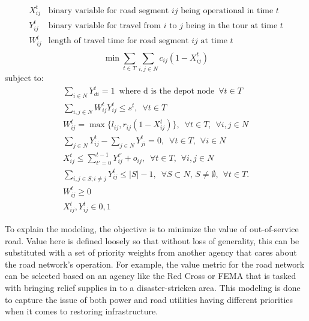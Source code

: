 \documentclass{article}
\begin{document}
\begin{displaymath}
\begin{array}{ll}
X_{ij}^t & \mbox{binary variable for road segment $ij$ being operational in time $t$}\\
Y_{ij}^t & \mbox{binary variable for travel from $i$ to $j$ being in the tour at time $t$}\\
W_{ij}^t & \mbox{length of travel time for road segment $ij$ at time $t$}\\
\end{array}
\end{displaymath}	
\begin{equation}
\min \sum_{t \in T}  \sum_{i,j \in N} c_{ij}(1-X_{ij}^t) 
\end{equation}
subject to:
\begin{eqnarray}
\sum_{i \in N} Y_{di}^t = 1\hspace{6pt} \mbox{where d is the depot node} \hspace{6pt} \forall t\in T \\
\sum_{i,j \in N} W_{ij}^t Y_{ij}^t \leq s^t, \hspace{6pt} \forall t\in T \\
W_{ij}^t = \max \{l_{ij}, r_{ij}(1-X_{ij}^t) \}, \hspace{6pt} \forall t\in T, \hspace{5pt} \forall i,j \in N\\
\sum_{j \in N} Y_{ij}^t - \sum_{j \in N} Y_{ji}^t = 0, \hspace{6pt} \forall t\in T, \hspace{5pt} \forall i \in N\\
X_{ij}^t \le \sum_{t'=0}^{t-1} Y_{ij}^{t'} + o_{ij} , \hspace{6pt} \forall t\in T,  \hspace{5pt} \forall i,j \in N\\
\sum_{i,j \in S; i\neq j} Y_{ij}^t \leq |S|-1, \hspace{6pt} \forall S \subset N, \hspace{2pt} S \neq \emptyset, \hspace{5pt} \forall t\in T.\\
W_{ij}^t \geq 0\\
X_{ij}^t,Y_{ij}^t \in {0,1} 
\end{eqnarray}

To explain the modeling, the objective is to minimize the value of out-of-service road. Value here is defined loosely so that without loss of generality, this can be substituted with a set of priority weights from another agency that cares about the road network's operation. For example, the value metric for the road network can be selected based on an agency like the Red Cross or FEMA that is tasked with bringing relief supplies in to a disaster-stricken area. This modeling is done to capture the issue of both power and road utilities having different priorities when it comes to restoring infrastructure.
\end{document}
